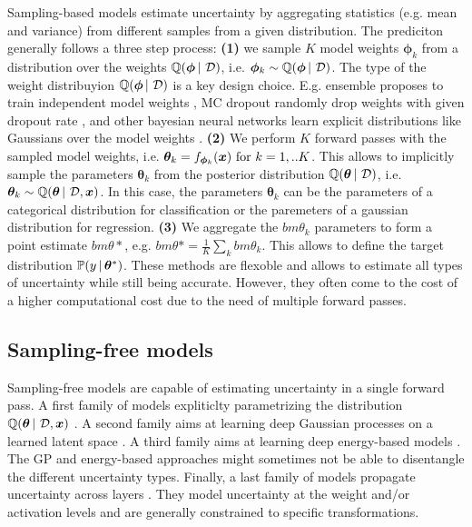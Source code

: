 Sampling-based models estimate uncertainty by aggregating statistics (e.g. mean and variance) from different samples from a given distribution. The prediciton generally follows a three step process:
\textbf{(1)} we sample $K$ model weights $\bm{\phi}_k$ from a distribution over the weights $\operatorname{\mathbb{Q}}(\bm{\phi} \,|\, \operatorname{\mathcal{D}})$, i.e. $\bm{\phi}_k \sim \operatorname{\mathbb{Q}}(\bm{\phi} \,|\, \operatorname{\mathcal{D}})$. The type of the weight distribuyion $\operatorname{\mathbb{Q}}(\bm{\phi} \,|\, \operatorname{\mathcal{D}})$ is a key design choice. E.g. ensemble proposes to train independent model weights \cite{ensemble_simple}, MC dropout randomly drop weights with given dropout rate \cite{drop_out}, and other bayesian neural networks learn explicit distributions like Gaussians over the model weights \cite{bayesian-networks}. \textbf{(2)} We perform $K$ forward passes with the sampled model weights, i.e. $\bm{\theta}_k = f_{\bm{\phi}_k}(\bm{x}) \text{ for } k=1,..K$. This allows to implicitly sample the parameters $\bm{\theta}_k$ from the posterior distribution $\operatorname{\mathbb{Q}}(\bm{\theta} \,|\, \operatorname{\mathcal{D}})$, i.e. $\bm{\theta}_k \sim \operatorname{\mathbb{Q}}(\bm{\theta} \,|\, \operatorname{\mathcal{D}}, \bm{x})$. In this case, the parameters $\bm{\theta}_k$ can be the parameters of a categorical distribution for classification or the paremeters of a gaussian distribution for regression. \textbf{(3)} We aggregate the $bm{\theta}_k$ parameters to form a point estimate $bm{\theta}*$, e.g. $bm{\theta}*=\frac{1}{K}\sum_k bm{\theta}_k$. This allows to define the target distribution $\mathbb{P}(y \,|\, \bm{\theta}^*)$. These methods are flexoble and allows to estimate all types of uncertainty while still being accurate. However, they often come to the cost of a higher computational cost due to the need of multiple forward passes.

\subsection{Sampling-free models}
Sampling-free models are capable of estimating uncertainty in a single forward pass. A first family of models expliticlty parametrizing the distribution $\operatorname{\mathbb{Q}}(\bm{\theta} \,|\, \operatorname{\mathcal{D}}, \bm{x})$ \citep{survey_evidential_uncertainty,evaluating_dbu,max_gap_id_ood,uncertainty-generative-classifier,multifaceted_uncertainty,graph_posterior, lightweight-prob-net}. A second family aims at learning deep Gaussian processes on a learned latent space \citep{uncertainty-distance-awareness, due, duq, uceloss}. A third family aims at learning deep energy-based models \citep{ood_ebm, jem_ebm}. The GP and energy-based approaches might sometimes not be able to disentangle the different uncertainty types. Finally, a last family of models propagate uncertainty across layers \citep{natural-parameter-network, sampling-free-variance-propagation, feed-forward-propagation, lightweight-prob-net, probabilistic-backprop-scalable-bnn}. They model uncertainty at the weight and/or activation levels and are generally constrained to specific transformations.

